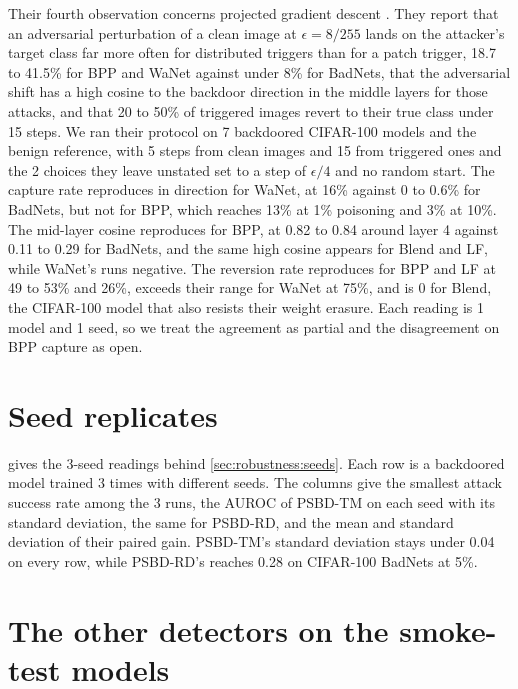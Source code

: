 Their fourth observation concerns projected gradient descent \cite{madry2018pgd}. They report that an adversarial perturbation of a clean image at $\epsilon = 8/255$ lands on the attacker's target class far more often for distributed triggers than for a patch trigger, 18.7 to 41.5\% for BPP and WaNet against under 8\% for BadNets, that the adversarial shift has a high cosine to the backdoor direction in the middle layers for those attacks, and that 20 to 50\% of triggered images revert to their true class under 15 steps. We ran their protocol on 7 backdoored CIFAR-100 models and the benign reference, with 5 steps from clean images and 15 from triggered ones and the 2 choices they leave unstated set to a step of $\epsilon/4$ and no random start. The capture rate reproduces in direction for WaNet, at 16\% against 0 to 0.6\% for BadNets, but not for BPP, which reaches 13\% at 1\% poisoning and 3\% at 10\%. The mid-layer cosine reproduces for BPP, at 0.82 to 0.84 around layer 4 against 0.11 to 0.29 for BadNets, and the same high cosine appears for Blend and LF, while WaNet's runs negative. The reversion rate reproduces for BPP and LF at 49 to 53\% and 26\%, exceeds their range for WaNet at 75\%, and is 0 for Blend, the CIFAR-100 model that also resists their weight erasure. Each reading is 1 model and 1 seed, so we treat the agreement as partial and the disagreement on BPP capture as open.

\section{Seed replicates}
\label{app:seeds}

 gives the 3-seed readings behind \cref{sec:robustness:seeds}. Each row is a backdoored model trained 3 times with different seeds. The columns give the smallest attack success rate among the 3 runs, the AUROC of PSBD-TM on each seed with its standard deviation, the same for PSBD-RD, and the mean and standard deviation of their paired gain. PSBD-TM's standard deviation stays under 0.04 on every row, while PSBD-RD's reaches 0.28 on CIFAR-100 BadNets at 5\%.


\FloatBarrier

\section{The other detectors on the smoke-test models}
\label{app:smoke}

